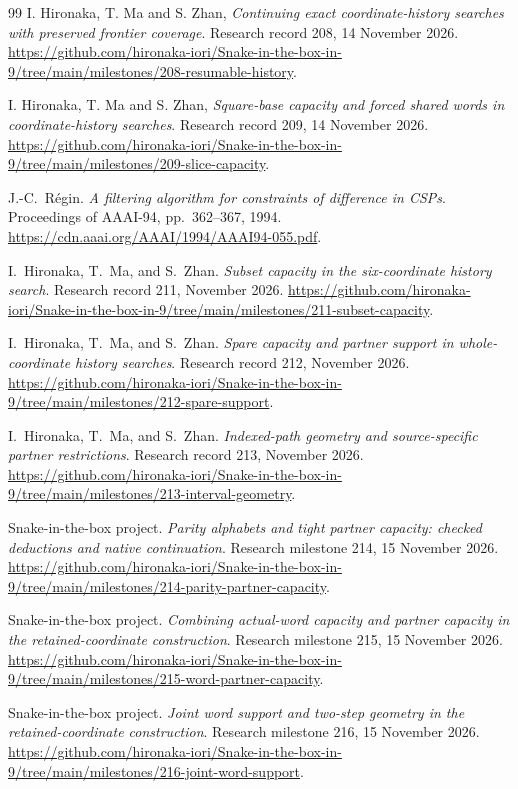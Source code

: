 \documentclass[11pt,a4paper]{article}
\theoremstyle{definition}
\theoremstyle{remark}
\begin{document}
\begin{thebibliography}{99}
I. Hironaka, T. Ma and S. Zhan, \emph{Continuing exact coordinate-history
searches with preserved frontier coverage}. Research record 208,
14 November 2026.
\url{https://github.com/hironaka-iori/Snake-in-the-box-in-9/tree/main/milestones/208-resumable-history}.

I. Hironaka, T. Ma and S. Zhan, \emph{Square-base capacity and forced
shared words in coordinate-history searches}. Research record 209,
14 November 2026.
\url{https://github.com/hironaka-iori/Snake-in-the-box-in-9/tree/main/milestones/209-slice-capacity}.

J.-C.~R\'egin. \emph{A filtering algorithm for constraints of difference
in CSPs}. Proceedings of AAAI-94, pp.~362--367, 1994.
\url{https://cdn.aaai.org/AAAI/1994/AAAI94-055.pdf}.

I.~Hironaka, T.~Ma, and S.~Zhan. \emph{Subset capacity in the
six-coordinate history search}. Research record 211, November 2026.
\url{https://github.com/hironaka-iori/Snake-in-the-box-in-9/tree/main/milestones/211-subset-capacity}.

I.~Hironaka, T.~Ma, and S.~Zhan. \emph{Spare capacity and partner support
in whole-coordinate history searches}. Research record 212, November 2026.
\url{https://github.com/hironaka-iori/Snake-in-the-box-in-9/tree/main/milestones/212-spare-support}.

I.~Hironaka, T.~Ma, and S.~Zhan. \emph{Indexed-path geometry and
source-specific partner restrictions}. Research record 213, November 2026.
\url{https://github.com/hironaka-iori/Snake-in-the-box-in-9/tree/main/milestones/213-interval-geometry}.


Snake-in-the-box project. \emph{Parity alphabets and tight partner
capacity: checked deductions and native continuation}. Research
milestone 214, 15 November 2026.
\url{https://github.com/hironaka-iori/Snake-in-the-box-in-9/tree/main/milestones/214-parity-partner-capacity}.


Snake-in-the-box project. \emph{Combining actual-word capacity and partner
capacity in the retained-coordinate construction}. Research milestone
215, 15 November 2026.
\url{https://github.com/hironaka-iori/Snake-in-the-box-in-9/tree/main/milestones/215-word-partner-capacity}.


Snake-in-the-box project. \emph{Joint word support and two-step geometry
in the retained-coordinate construction}. Research milestone 216,
15 November 2026.
\url{https://github.com/hironaka-iori/Snake-in-the-box-in-9/tree/main/milestones/216-joint-word-support}.



\end{thebibliography}
\end{document}
